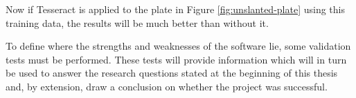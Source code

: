 Now if Tesseract is applied to the plate in Figure \ref{fig:unslanted-plate} using this training data, the results will be much better than without it.


To define where the strengths and weaknesses of the software lie, some validation tests must be performed. These tests will provide information which will in turn be used to answer the research questions stated at the beginning of this thesis and, by extension, draw a conclusion on whether the project was successful.




